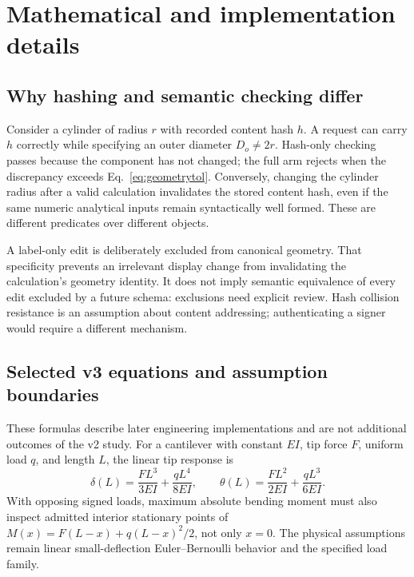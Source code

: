 \documentclass[10pt]{article}
\begin{document}



\appendix
\section{Mathematical and implementation details}

\subsection{Why hashing and semantic checking differ}

Consider a cylinder of radius \(r\) with recorded content hash \(h\). A
request can carry \(h\) correctly while specifying an outer diameter
\(D_o\ne2r\). Hash-only checking passes because the component has not changed;
the full arm rejects when the discrepancy exceeds
Eq.~\eqref{eq:geometrytol}. Conversely, changing the cylinder radius after a
valid calculation invalidates the stored content hash, even if the same
numeric analytical inputs remain syntactically well formed. These are
different predicates over different objects.

A label-only edit is deliberately excluded from canonical geometry. That
specificity prevents an irrelevant display change from invalidating the
calculation's geometry identity. It does not imply semantic equivalence of
every edit excluded by a future schema: exclusions need explicit review.
Hash collision resistance is an assumption about content addressing;
authenticating a signer would require a different mechanism.

\subsection{Selected v3 equations and assumption boundaries}

These formulas describe later engineering implementations and are not
additional outcomes of the v2 study. For a cantilever with constant \(EI\),
tip force \(F\), uniform load \(q\), and length \(L\), the linear tip response is
\begin{equation}
\delta(L)=\frac{FL^3}{3EI}+\frac{qL^4}{8EI},\qquad
\theta(L)=\frac{FL^2}{2EI}+\frac{qL^3}{6EI}.
\end{equation}
With opposing signed loads, maximum absolute bending moment must also inspect
admitted interior stationary points of
\(M(x)=F(L-x)+q(L-x)^2/2\), not only \(x=0\).
The physical assumptions remain linear small-deflection Euler--Bernoulli
behavior and the specified load family.
\end{document}
